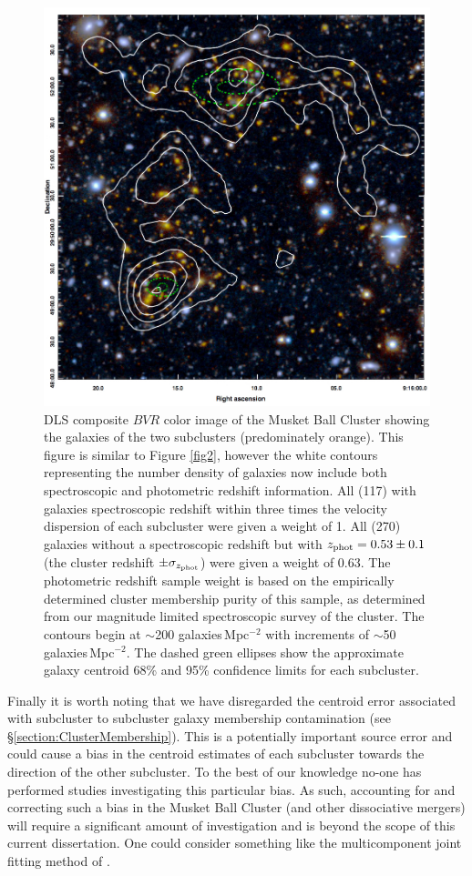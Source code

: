 \begin{figure}
\centering
\includegraphics[width=5in]{Chapter4/DLScolor_wGalDenCon.png}
\caption[Musket Ball Cluster galaxy number density map including spectroscopic redshift information.]{
DLS composite $BVR$ color image of the Musket Ball Cluster showing  the galaxies of the two subclusters (predominately orange). 
This figure is similar to Figure \ref{fig2}, however the white contours representing the number density of galaxies now include both spectroscopic and photometric redshift information.
All (117) with galaxies spectroscopic redshift within three times the velocity dispersion of each subcluster were given a weight of 1.
All (270) galaxies without a spectroscopic redshift but with $z_{\rm phot}=0.53\pm0.1$ (the cluster redshift $\pm\sigma_{z_{\rm phot}}$) were given a weight of 0.63.
The photometric redshift sample weight is based on the empirically determined cluster membership purity of this sample, as determined from our magnitude limited spectroscopic survey of the cluster.
The contours begin at $\sim$200 galaxies\,Mpc$^{-2}$ with increments of $\sim$50 galaxies\,Mpc$^{-2}$.
The dashed green ellipses show the approximate galaxy centroid 68\% and 95\% confidence limits for each subcluster.
}
\label{figure:GalDenMap_withspec}
\end{figure}

Finally it is worth noting that  we have disregarded the centroid error associated with subcluster to subcluster galaxy membership contamination (see \S\ref{section:ClusterMembership}).
This is a potentially important source error and could cause a bias in the centroid estimates of each subcluster towards the direction of the other subcluster.
To the best of our knowledge no-one has performed studies investigating this particular bias. As such, accounting for and correcting such a bias in the Musket Ball Cluster (and other dissociative mergers) will require a significant amount of investigation and is beyond the scope of this current dissertation.
One could consider something like the multicomponent joint fitting method of \citet{Walker:2011eg}.


